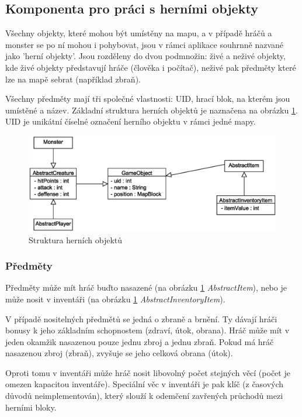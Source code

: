 \documentclass[11pt,a4paper]{scrartcl}
\begin{document}
	\subsection{Komponenta pro práci s herními objekty}
	Všechny objekty, které mohou být umístěny na mapu, a v případě hráčů a monster se po ní mohou i pohybovat, jsou v rámci aplikace souhrnně nazvané jako 'herní objekty'. Jsou rozděleny do dvou podmnožin: živé a neživé objekty, kde živé objekty představují hráče (člověka i počítač), neživé pak předměty které lze na mapě sebrat (například zbraň).
	
	Všechny předměty mají tři společné vlastnosti: UID, hrací blok, na kterém jsou umístěné a název. Základní struktura herních objektů je naznačena na obrázku \ref{fig:game-obj}. UID je unikátní číselné označení herního objektu v rámci jedné mapy.
	
	\begin{figure}[H]
		\centering
		\includegraphics[width=140mm]{core-game-objects-simple}
		\caption{Struktura herních objektů}
		\label{fig:game-obj}
	\end{figure}
	
	\subsubsection{Předměty}
	Předměty může mít hráč buďto nasazené (na obrázku \ref{fig:game-obj} \textit{AbstractItem}), nebo je může nosit v inventáři (na obrázku \ref{fig:game-obj} \textit{AbstractInventoryItem}). 
	
	V případě nositelných předmětů se jedná o zbraně a brnění. Ty dávají hráči bonusy k jeho základním schopnostem (zdraví, útok, obrana). Hráč může mít v jeden okamžik nasazenou pouze jednu zbroj a jednu zbraň. Pokud má hráč nasazenou zbroj (zbraň), zvyšuje se jeho celková obrana (útok).
	
	Oproti tomu v inventáři může hráč nosit libovolný počet stejných věcí (počet je omezen kapacitou inventáře). Speciální věc v inventáři je pak klíč (z časových důvodů neimplementován), který slouží k odemčení zavřených průchodů mezi herními bloky. 
	
\end{document}
